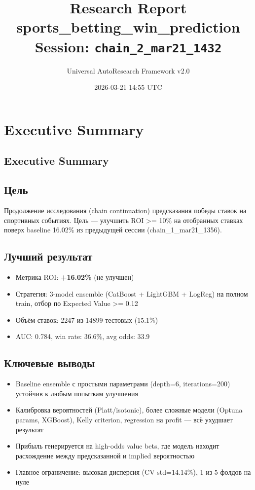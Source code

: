 \documentclass[12pt,a4paper]{article}
\title{
    \Large\textbf{Research Report}\\[0.5em]
    \large sports\_betting\_win\_prediction\\[0.3em]
    \normalsize Session: \texttt{chain\_2\_mar21\_1432}
}
\author{Universal AutoResearch Framework v2.0}
\date{2026-03-21 14:55 UTC}
\begin{document}
\maketitle
\tableofcontents
\newpage


\section{Executive Summary}

\subsection{Executive Summary}

\subsection{Цель}
Продолжение исследования (chain continuation) предсказания победы ставок на спортивных событиях. Цель — улучшить ROI >= 10\% на отобранных ставках поверх baseline 16.02\% из предыдущей сессии (chain\_1\_mar21\_1356).

\subsection{Лучший результат}
\begin{itemize}
  \item Метрика ROI: \textbf{+16.02\%} (не улучшен)
  \item Стратегия: 3-model ensemble (CatBoost + LightGBM + LogReg) на полном train, отбор по Expected Value >= 0.12
  \item Объём ставок: 2247 из 14899 тестовых (15.1\%)
  \item AUC: 0.784, win rate: 36.6\%, avg odds: 33.9
\end{itemize}

\subsection{Ключевые выводы}
\begin{itemize}
  \item Baseline ensemble с простыми параметрами (depth=6, iterations=200) устойчив к любым попыткам улучшения
  \item Калибровка вероятностей (Platt/isotonic), более сложные модели (Optuna params, XGBoost), Kelly criterion, regression на profit — всё ухудшает результат
  \item Прибыль генерируется на high-odds value bets, где модель находит расхождение между предсказанной и implied вероятностью
  \item Главное ограничение: высокая дисперсия (CV std=14.14\%), 1 из 5 фолдов на нуле
\end{itemize}
\end{document}

